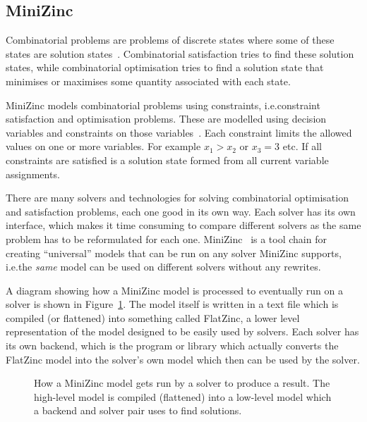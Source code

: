 \documentclass[a4paper,12pt]{article}
\begin{document}
\subsection{MiniZinc}\label{sec:mzn}

Combinatorial problems are problems of discrete states where some of these states are
solution states~\cite{combopt}. Combinatorial satisfaction tries to find these solution states,
while combinatorial optimisation tries to find a solution state that minimises or
maximises some quantity associated with each state.

MiniZinc models combinatorial problems using constraints, i.e.\@ constraint satisfaction
and optimisation problems. These are modelled using decision variables and
constraints on those variables~\cite{constraintshandbook}. Each constraint limits the
allowed values on one or more variables.
For example $x_1 > x_2$ or $x_3 = 3$ etc. If all constraints are satisfied is a
solution state formed from all current variable assignments.

There are many solvers and technologies for solving combinatorial optimisation and
satisfaction problems, each one good in its own way. Each solver
has its own interface, which makes it time consuming to compare different
solvers as the same problem has to be reformulated for each one. MiniZinc~\cite{MiniZinc}
is a tool chain for creating ``universal'' models that can be run on any solver MiniZinc
supports, i.e.\@ the \emph{same} model can be used on different solvers without any
rewrites.

A diagram showing how a MiniZinc model is processed to eventually run on a
solver is shown in Figure~\ref{fig:minizinc}. The model itself is written in a text file
which is compiled (or flattened) into something called FlatZinc, a lower level
representation of the model designed to be easily used by solvers. Each
solver has its own backend, which is the program or library which actually converts the
FlatZinc model into the solver's own model which then can be used by the solver.

\begin{figure}[ht]
  \centering
  
  \caption{How a MiniZinc model gets run by a solver to produce a result. The high-level
    model is compiled (flattened) into a low-level model which a backend and solver pair
    uses to find solutions.}%
  \label{fig:minizinc}
\end{figure}
\end{document}
